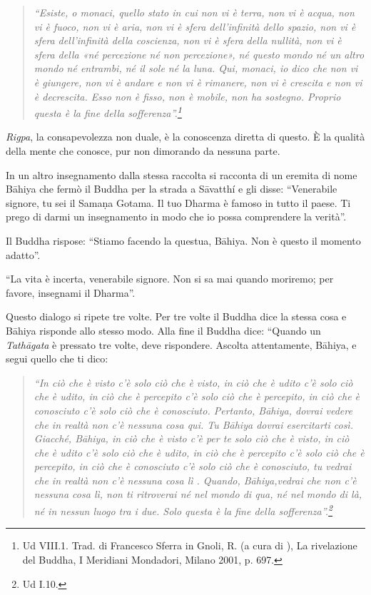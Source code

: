 \begin{quote}
\itshape
``Esiste, o monaci, quello stato in cui non vi è terra, non vi è acqua, non vi è fuoco, non vi è aria, non vi è sfera dell'infinità dello spazio, non vi è sfera dell'infinità della coscienza, non vi è sfera della nullità, non vi è sfera della «né percezione né non percezione», né questo mondo né un altro mondo né entrambi, né il sole né la luna. Qui, monaci, io dico che non vi è giungere, non vi è andare e non vi è rimanere, non vi è crescita e non vi è decrescita. Esso non è fisso, non è mobile, non ha sostegno. Proprio questa è la fine della sofferenza''.\footnote{Ud VIII.1. Trad. di Francesco Sferra in Gnoli, R. (a cura di ), La rivelazione del Buddha, I Meridiani Mondadori, Milano 2001, p. 697.}
\end{quote}

\textit{Rigpa}, la consapevolezza non duale, è la conoscenza diretta di questo. È la qualità della mente che conosce, pur non dimorando da nessuna parte.

In un altro insegnamento dalla stessa raccolta si racconta di un eremita di nome Bāhiya che fermò il Buddha per la strada a Sāvatthí e gli disse: ``Venerabile signore, tu sei il Samaṇa Gotama. Il tuo Dharma è famoso in tutto il paese. Ti prego di darmi un insegnamento in modo che io possa comprendere la verità''.

Il Buddha rispose: ``Stiamo facendo la questua, Bāhiya. Non è questo il momento adatto''.

``La vita è incerta, venerabile signore. Non si sa mai quando moriremo; per favore, insegnami il Dharma''.

Questo dialogo si ripete tre volte. Per tre volte il Buddha dice la stessa cosa e Bāhiya risponde allo stesso modo. Alla fine il Buddha dice: ``Quando un \textit{Tathāgata }è pressato tre volte, deve rispondere. Ascolta attentamente, Bāhiya, e segui quello che ti dico: 

\begin{quote}
\itshape
``In ciò che è visto c'è solo ciò che è visto, in ciò che è udito c'è solo ciò che è udito, in ciò che è percepito c'è solo ciò che è percepito, in ciò che è conosciuto c'è solo ciò che è conosciuto. Pertanto, Bāhiya, dovrai vedere che in realtà non c'è nessuna cosa qui. Tu Bāhiya dovrai esercitarti così. Giacché, Bāhiya, in ciò che è visto c'è per te solo ciò che è visto, in ciò che è udito c'è solo ciò che è udito, in ciò che è percepito c'è solo ciò che è percepito, in ciò che è conosciuto c'è solo ciò che è conosciuto, tu vedrai che in realtà non c'è nessuna cosa lì . Quando, Bāhiya,vedrai che non c'è nessuna cosa lì, non ti ritroverai né nel mondo di qua, né nel mondo di là, né in nessun luogo tra i due. Solo questa è la fine della sofferenza''.\footnote{Ud I.10.}
\end{quote}

